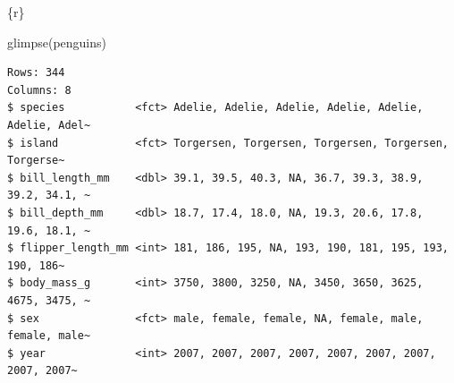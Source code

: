 \documentclass[
  letterpaper,
  DIV=11,
  numbers=noendperiod]{scrreprt}
\newenvironment{Shaded}{\begin{snugshade}}{\end{snugshade}}
\newcommand{\FunctionTok}[1]{\textcolor[rgb]{0.28,0.35,0.67}{#1}}
\newcommand{\InformationTok}[1]{\textcolor[rgb]{0.37,0.37,0.37}{#1}}
\newcommand{\NormalTok}[1]{\textcolor[rgb]{0.00,0.23,0.31}{#1}}
\begin{document}
\begin{tcolorbox}[enhanced jigsaw, colframe=quarto-callout-note-color-frame, breakable, colback=white, toprule=.15mm, leftrule=.75mm, left=2mm, opacityback=0, rightrule=.15mm, arc=.35mm, bottomrule=.15mm]
\begin{Shaded}
\begin{Highlighting}[]
\InformationTok{\textasciigrave{}\textasciigrave{}\textasciigrave{}\{r\}}

\FunctionTok{glimpse}\NormalTok{(penguins)}
\InformationTok{\textasciigrave{}\textasciigrave{}\textasciigrave{}}
\end{Highlighting}
\end{Shaded}

\begin{verbatim}
Rows: 344
Columns: 8
$ species           <fct> Adelie, Adelie, Adelie, Adelie, Adelie, Adelie, Adel~
$ island            <fct> Torgersen, Torgersen, Torgersen, Torgersen, Torgerse~
$ bill_length_mm    <dbl> 39.1, 39.5, 40.3, NA, 36.7, 39.3, 38.9, 39.2, 34.1, ~
$ bill_depth_mm     <dbl> 18.7, 17.4, 18.0, NA, 19.3, 20.6, 17.8, 19.6, 18.1, ~
$ flipper_length_mm <int> 181, 186, 195, NA, 193, 190, 181, 195, 193, 190, 186~
$ body_mass_g       <int> 3750, 3800, 3250, NA, 3450, 3650, 3625, 4675, 3475, ~
$ sex               <fct> male, female, female, NA, female, male, female, male~
$ year              <int> 2007, 2007, 2007, 2007, 2007, 2007, 2007, 2007, 2007~
\end{verbatim}

\end{tcolorbox}
\end{document}
